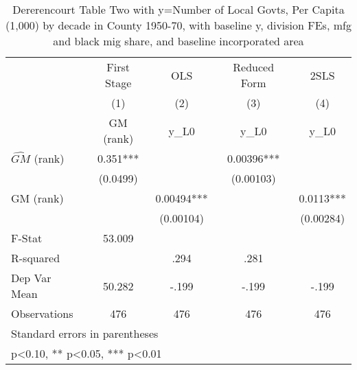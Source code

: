\begin{table}[htbp]\centering
\def\sym#1{\ifmmode^{#1}\else\(^{#1}\)\fi}
\caption{Dererencourt Table Two with y=Number of Local Govts, Per Capita (1,000) by decade in County 1950-70, with baseline y, division FEs, mfg and black mig share, and baseline incorporated area}
\begin{tabular}{l*{4}{c}}
\toprule
                    & First Stage   &         OLS   &Reduced Form   &        2SLS   \\
                    &\multicolumn{1}{c}{(1)}&\multicolumn{1}{c}{(2)}&\multicolumn{1}{c}{(3)}&\multicolumn{1}{c}{(4)}\\
                    &\multicolumn{1}{c}{GM  (rank)}&\multicolumn{1}{c}{y\_L0}&\multicolumn{1}{c}{y\_L0}&\multicolumn{1}{c}{y\_L0}\\
\midrule
$\hat{GM}$ (rank)   &       0.351***&               &     0.00396***&               \\
                    &    (0.0499)   &               &   (0.00103)   &               \\
\addlinespace
GM  (rank)          &               &     0.00494***&               &      0.0113***\\
                    &               &   (0.00104)   &               &   (0.00284)   \\
\midrule
F-Stat              &      53.009   &               &               &               \\
R-squared           &               &        .294   &        .281   &               \\
Dep Var Mean        &      50.282   &       -.199   &       -.199   &       -.199   \\
Observations        &         476   &         476   &         476   &         476   \\
\bottomrule
\multicolumn{5}{l}{\footnotesize Standard errors in parentheses}\\
\multicolumn{5}{l}{\footnotesize * p<0.10, ** p<0.05, *** p<0.01}\\
\end{tabular}
\end{table}
